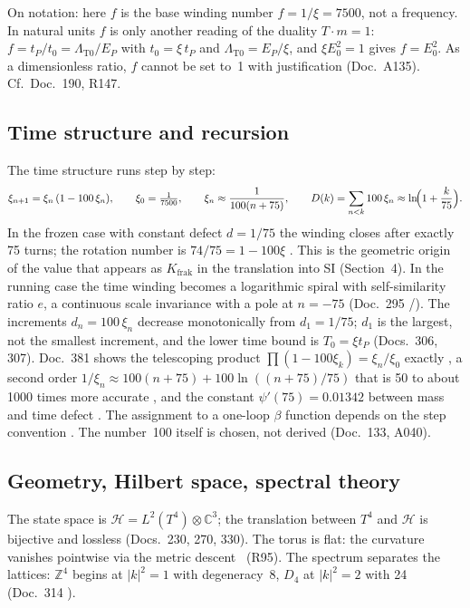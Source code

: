 On notation: here $f$ is the base winding number $f = 1/\xi = 7500$, not a frequency. In natural units $f$ is only another reading of the duality $T\cdot m = 1$: $f = t_P/t_0 = \Lambda_{\text{T0}}/E_P$ with $t_0 = \xi\,t_P$ and $\Lambda_{\text{T0}} = E_P/\xi$, and $\xi E_0^2 = 1$ gives $f = E_0^2$. As a dimensionless ratio, $f$ cannot be set to~1 with justification (Doc.~A135). Cf.\ Doc.~190, R147.

\subsection{Time structure and recursion}

The time structure runs step by step:
\begin{equation}
  \xi_{n+1}=\xi_n\,(1-100\,\xi_n),\qquad \xi_0=\tfrac{1}{7500},\qquad
  \xi_n\approx\frac{1}{100(n+75)},\qquad D(k)=\sum_{n<k}100\,\xi_n\approx\ln\!\Bigl(1+\frac{k}{75}\Bigr).
\end{equation}
In the frozen case with constant defect $d=1/75$ the winding closes after exactly 75 turns; the
rotation number is $74/75=1-100\xi$ \BM. This is the geometric origin of the value that appears
as $K_{\text{frak}}$ in the translation into SI (Section~4). In the running case the time winding
becomes a logarithmic spiral with self-similarity ratio $e$, a continuous scale invariance with a
pole at $n=-75$ (Doc.~295 \BM/\KM). The increments $d_n=100\,\xi_n$ decrease monotonically from
$d_1=1/75$; $d_1$ is the largest, not the smallest increment, and the lower time bound is
$T_0=\xi t_P$ (Docs.~306, 307). Doc.~381 shows the telescoping product
$\prod(1-100\xi_k)=\xi_n/\xi_0$ exactly \BM, a second order
$1/\xi_n\approx100(n+75)+100\ln((n+75)/75)$ that is 50 to about 1000 times more accurate \KM, and
the constant $\psi'(75)=0.01342$ between mass and time defect \KM. The assignment to a one-loop
$\beta$ function depends on the step convention \SM. The number~100 itself is chosen, not derived
(Doc.~133, A040).

\subsection{Geometry, Hilbert space, spectral theory}

The state space is $\mathcal H=L^2(T^4)\otimes\mathbb C^3$; the translation between $T^4$ and
$\mathcal H$ is bijective and lossless (Docs.~230, 270, 330). The torus is flat: the curvature
vanishes pointwise via the metric descent \BM\ (R95). The spectrum separates the lattices:
$\mathbb Z^4$ begins at $|k|^2=1$ with degeneracy~8, $D_4$ at $|k|^2=2$ with 24 (Doc.~314 \KM).


